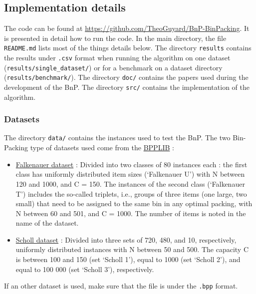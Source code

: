 \subsection{Implementation details}

\noindent The code can be found at \href{https://github.com/TheoGuyard/BnP-BinPacking}{https://github.com/TheoGuyard/BnP-BinPacking}. It is presented in detail how to run the code. In the main directory, the file \texttt{README.md} lists most of the things details below. The directory \texttt{results} contains the results under \texttt{.csv} format when running the algorithm on one dataset (\texttt{results/single\_dataset/}) or for a benchmark on a dataset directory (\texttt{results/benchmark/}). The directory \texttt{doc/} contains the papers used during the development of the BnP. The directory \texttt{src/} contains the implementation of the algorithm.\\

\subsubsection{Datasets}
The directory \texttt{data/} contains the instances used to test the BnP. The two Bin-Packing type of datasets used come from the \href{http://or.dei.unibo.it/library/bpplib}{BPPLIB} :
\begin{itemize}
	\item \href{https://link.springer.com/article/10.1007/BF00226291}{Falkenauer dataset} : Divided into two classes of 80 instances each : the first class has uniformly distributed item sizes (‘Falkenauer U’) with N between 120 and 1000, and C = 150. The instances of the second class (‘Falkenauer T’) includes the so-called triplets, i.e., groups of three items (one large, two small) that need to be assigned to the same bin in any optimal packing, with N between 60 and 501, and C = 1000. The number of items is noted in the name of the dataset.
	\item \href{https://www.sciencedirect.com/science/article/abs/pii/S0305054896000822}{Scholl dataset} : Divided into three sets of 720, 480, and 10, respectively, uniformly distributed instances with N between 50 and 500. The capacity C is between 100 and 150 (set ‘Scholl 1’), equal to 1000 (set ‘Scholl 2’), and equal to 100 000 (set ‘Scholl 3’), respectively.
\end{itemize}
If an other dataset is used, make sure that the file is under the \texttt{.bpp} format.

